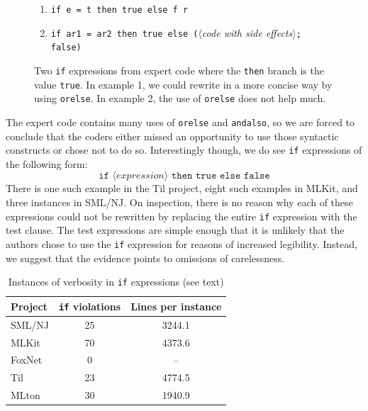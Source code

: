 \documentclass[12pt,abstracton]{scrartcl}
\begin{document}
\begin{figure}[h!]
\begin{enumerate}
\item \texttt{if e = t then true else f r}
\item \texttt{if ar1 = ar2 then true else (}$\langle$\emph{code with side effects}$\rangle$\texttt{; false)}
\end{enumerate}
\caption{Two \texttt{if} expressions from expert code where the \texttt{then} branch is the value \texttt{true}. In example 1, we could
rewrite in a more concise way by using \texttt{orelse}. In example 2, the use of \texttt{orelse} does not help much.}
\label{figure:ifthentrue}
\end{figure}

The expert code contains many uses of \texttt{orelse} and \texttt{andalso}, so we are forced to
conclude that the coders either missed an opportunity to use those syntactic constructs or chose
not to do so. Interestingly though, we do see \texttt{if} expressions of the following form:
\[\texttt{if }\langle expression\rangle\texttt{ then true else false}\]
There is one such example in the Til project, eight such examples in MLKit, and three instances
in SML/NJ. On inspection, there is no reason why each of these expressions could not be
rewritten by replacing the entire \texttt{if} expression with the test clause.
The test expressions are simple enough that it is unlikely that the authors
chose to use the \texttt{if} expression for reasons of increased legibility.
Instead, we suggest that the evidence points to omissions of carelessness.

\begin{table}[h!]
\centering
\begin{tabular}{|l||c|c|}\hline
Project & \texttt{if} violations & Lines per instance \\ \hline\hline
SML/NJ & 25 & 3244.1 \\
MLKit & 70 & 4373.6 \\
FoxNet & 0 & -- \\
Til & 23 & 4774.5 \\
MLton & 30 & 1940.9 \\ \hline
\end{tabular}
\caption{Instances of verbosity in \texttt{if} expressions (see text)}
\label{table:style}
\end{table}
\end{document}
